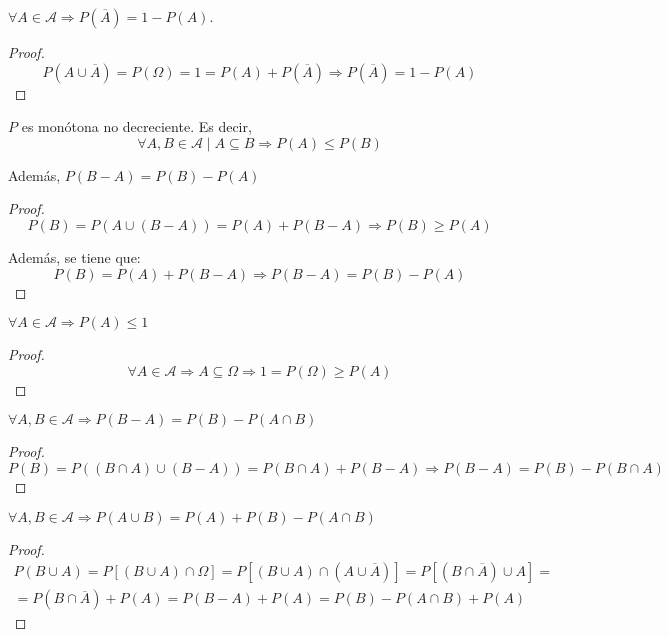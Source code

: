\begin{prop}
    $\forall A \in \mathcal{A} \Rightarrow P(\overline{A}) = 1-P(A)$.
\end{prop}
\begin{proof}
  $$P(A \cup \overline{A}) = P(\Omega) = 1 = P(A) + P(\overline{A}) \Rightarrow P(\overline{A}) = 1 - P(A)$$
\end{proof}

\begin{prop}
    $P$ es monótona no decreciente. Es decir,
    $$\forall A,B \in \mathcal{A} \mid A \subseteq B \Rightarrow P(A) \leq P(B)$$
    
    Además, $P(B-A)=P(B)-P(A)$
\end{prop}
\begin{proof}
  $$P(B) = P(A \cup (B-A)) = P(A) + P(B-A) \Rightarrow P(B) \geq P(A)$$

    Además, se tiene que:
  $$P(B) = P(A) + P(B-A) \Rightarrow P(B-A) = P(B) - P(A)$$
\end{proof}

\begin{prop}
    $\forall A \in \mathcal{A} \Rightarrow P(A) \leq 1$
\end{prop}
\begin{proof}
  $$\forall A \in \mathcal{A} \Rightarrow A \subseteq \Omega \Rightarrow 1 = P(\Omega) \geq P(A)$$
\end{proof}

\begin{prop}
    $\forall A,B \in \mathcal{A} \Rightarrow P(B-A) = P(B) - P(A \cap B)$
\end{prop}
\begin{proof}
  $$P(B) = P((B \cap A) \cup (B-A)) = P(B \cap A) + P(B-A) \Rightarrow P(B-A) = P(B) - P(B \cap A)$$
\end{proof}

\begin{prop}
    $\forall A,B \in \mathcal{A} \Rightarrow P(A\cup B) = P(A) + P(B) -P(A \cap B)$
\end{prop}
\begin{proof}
    \begin{multline*}
        P(B \cup A)
        = P[(B \cup A) \cap \Omega]
        = P[(B \cup A) \cap (A \cup \overline{A})]
        = P[(B \cap \overline{A}) \cup A]
        =\\
        = P(B \cap \overline{A}) + P(A)
        = P(B-A) + P(A)
        = P(B) - P(A\cap B) + P(A)
    \end{multline*}
\end{proof}

